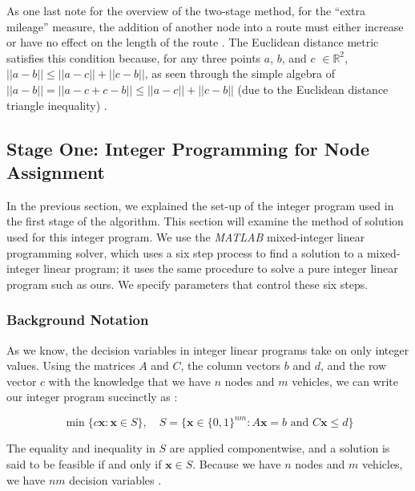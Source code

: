 \documentclass[11pt]{article}
\begin{document}
\vspace{1em}

As one last note for the overview of the two-stage method, for the ``extra mileage'' measure, the addition of another node into a route must either increase or have no effect on the length of the route \cite{intro_logistics_book}.  The Euclidean distance metric satisfies this condition because, for any three points $a$, $b$, and $c$ $\in \mathbb{R}^{2}$, $||a-b|| \leq ||a-c|| + ||c-b||$, as seen through the simple algebra of $||a-b|| = ||a-c+c-b|| \leq ||a-c|| + ||c-b||$ (due to the Euclidean distance triangle inequality) \cite{LA_textbook}.



\subsection{Stage One: Integer Programming for Node Assignment}

In the previous section, we explained the set-up of the integer program used in the first stage of the algorithm. This section will examine the method of solution used for this integer program. We use the \textit{MATLAB} mixed-integer linear programming solver, which uses a six step process to find a solution to a mixed-integer linear program; it uses the same procedure to solve a pure integer linear program such as ours.  We specify parameters that control these six steps.  %

\subsubsection{Background Notation}

As we know, the decision variables in integer linear programs take on only integer values. Using the matrices $A$ and $C$, the column vectors $b$ and $d$, and the row vector $c$ with the knowledge that we have $n$ nodes and $m$ vehicles, we can write our integer program succinctly as \cite{IP_textbook}: 

\[\min \{ c \textbf{x}: \textbf{x} \in S\}, \hspace{1em} S = \{ \textbf{x} \in \{0,1\}^{nm}: A \textbf{x} = b \text{ and } C \textbf{x} \leq d \}\] 

\noindent The equality and inequality in $S$ are applied componentwise, and a solution is said to be feasible if and only if $\textbf{x} \in S$.  Because we have $n$ nodes and $m$ vehicles, we have $nm$ decision variables \cite{IP_textbook}.
\end{document}
